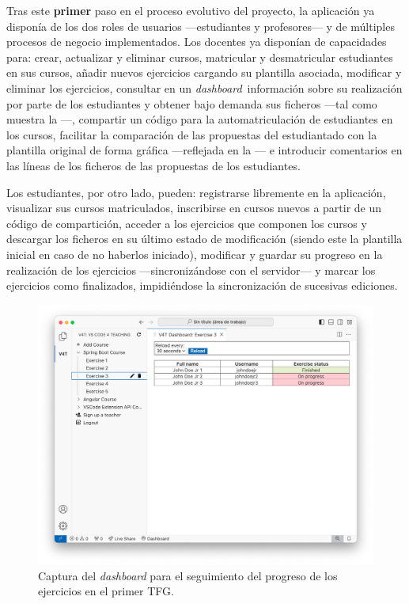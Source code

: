 Tras este \textbf{primer} paso en el proceso evolutivo del proyecto, la aplicación ya disponía de los dos roles de usuarios ---estudiantes y profesores--- y de múltiples procesos de negocio implementados. Los docentes ya disponían de capacidades para: crear, actualizar y eliminar cursos, matricular y desmatricular estudiantes en sus cursos, añadir nuevos ejercicios cargando su plantilla asociada, modificar y eliminar los ejercicios, consultar en un \textit{dashboard} información sobre su realización por parte de los estudiantes y obtener bajo demanda sus ficheros ---tal como muestra la ---, compartir un código para la automatriculación de estudiantes en los cursos, facilitar la comparación de las propuestas del estudiantado con la plantilla original de forma gráfica ---reflejada en la --- e introducir comentarios en las líneas de los ficheros de las propuestas de los estudiantes.

Los estudiantes, por otro lado, pueden: registrarse libremente en la aplicación, visualizar sus cursos matriculados, inscribirse en cursos nuevos a partir de un código de compartición, acceder a los ejercicios que componen los cursos y descargar los ficheros en su último estado de modificación (siendo este la plantilla inicial en caso de no haberlos iniciado), modificar y guardar su progreso en la realización de los ejercicios ---sincronizándose con el servidor--- y marcar los ejercicios como finalizados, impidiéndose la sincronización de sucesivas ediciones.

\begin{figure}[ht!]
    \centering
    \includegraphics[width=0.825\linewidth]{imagenes/utilizadas/1-introduccion/historia-tfg1-dashboard.png}
    \caption{Captura del \textit{dashboard} para el seguimiento del progreso de los ejercicios en el primer TFG.}
    \label{fig:historiaProyecto1Dashboard}
\end{figure}


